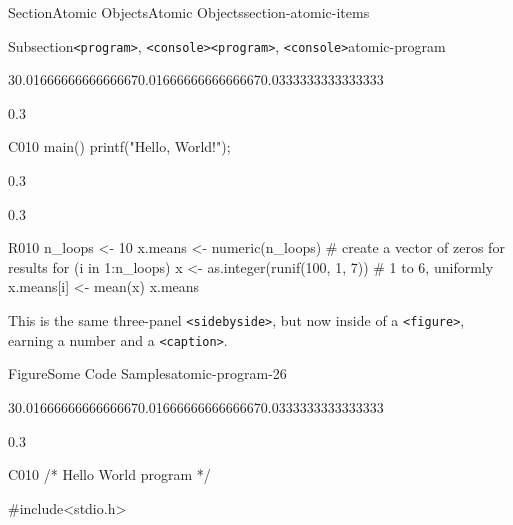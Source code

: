 \documentclass[twoside,10pt,]{article}
\newcommand{\mono}[1]{\texttt{#1}}
\numberwithin{equation}{section}
\newcommand{\consoleinput}[1]{\textbf{#1}}
\begin{document}
\begin{sectionptx}{Section}{Atomic Objects}{}{Atomic Objects}{}{}{section-atomic-items}
\begin{subsectionptx}{Subsection}{\mono{<program>}, \mono{<console>}}{}{\mono{<program>}, \mono{<console>}}{}{}{atomic-program}
\begin{sidebyside}{3}{0.0166666666666667}{0.0166666666666667}{0.0333333333333333}
\begin{sbspanel}{0.3}
\begin{program}{C}{0}{1}{0}
main()
{
    printf("Hello, World!");
}
\end{program}
\end{sbspanel}%
\begin{sbspanel}{0.3}%
\end{sbspanel}%
\begin{sbspanel}{0.3}%
\begin{program}{R}{0}{1}{0}
n_loops <- 10
x.means <- numeric(n_loops)  # create a vector of zeros for results
for (i in 1:n_loops){
    x <- as.integer(runif(100, 1, 7))  # 1 to 6, uniformly
    x.means[i] <- mean(x)
}
x.means
\end{program}
\end{sbspanel}%
\end{sidebyside}%
\par
This is the same three-panel \mono{<sidebyside>}, but now inside of a \mono{<figure>}, earning a number and a \mono{<caption>}.%
\begin{figureptx}{Figure}{Some Code Samples}{atomic-program-26}{}%
\begin{sidebyside}{3}{0.0166666666666667}{0.0166666666666667}{0.0333333333333333}%
\begin{sbspanel}{0.3}%
\begin{program}{C}{0}{1}{0}
/* Hello World program */

#include<stdio.h>


\end{program}
\end{sbspanel}
\end{sidebyside}
\end{figureptx}
\end{subsectionptx}
\end{sectionptx}
\end{document}
